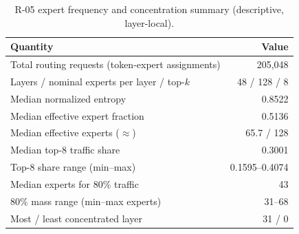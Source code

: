 \begin{table}[t]
\centering
\caption{R-05 expert frequency and concentration summary (descriptive, layer-local).}
\label{tab:r2-05-summary}
\small
\begin{tabular}{@{}lr@{}}
\toprule
Quantity & Value \\
\midrule
Total routing requests (token-expert assignments) & 205,048 \\
Layers / nominal experts per layer / top-$k$ & 48 / 128 / 8 \\
Median normalized entropy & 0.8522 \\
Median effective expert fraction & 0.5136 \\
Median effective experts ($\approx$) & 65.7 / 128 \\
Median top-8 traffic share & 0.3001 \\
Top-8 share range (min--max) & 0.1595--0.4074 \\
Median experts for 80\% traffic & 43 \\
80\% mass range (min--max experts) & 31--68 \\
Most / least concentrated layer & 31 / 0 \\
\bottomrule
\end{tabular}
\end{table}
